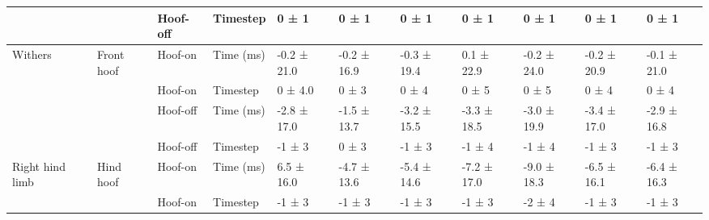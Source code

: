 \begin{sidewaystable}[!htbp]
{\begin{tabular}{p{3cm}p{2cm}p{2cm}p{2cm}p{1.5cm}p{1.5cm}p{1.5cm}p{1.5cm}p{1.5cm}p{1.5cm}p{1.5cm}}
                                  &                                                & Hoof-off                     & Timestep                      & 0 ± 1                           & 0 ± 1                           & 0 ± 1                           & 0 ± 1                           & 0 ± 1                            & 0 ± 1                           & 0 ± 1       \\
                                  \midrule
\multicolumn{1}{l}{Withers}          & \multicolumn{1}{l}{Front hoof}                    & Hoof-on                      & Time (ms)                     & -0.2 ± 21.0                     & -0.2 ± 16.9                     & -0.3 ± 19.4                     & 0.1 ± 22.9                      & -0.2 ± 24.0                      & -0.2 ± 20.9                     & -0.1 ± 21.0 \\
                                  &                                                & Hoof-on                      & Timestep                      & 0 ± 4.0                         & 0 ± 3                           & 0 ± 4                           & 0 ± 5                           & 0 ± 5                            & 0 ± 4                           & 0 ± 4       \\
                                  &                                                & Hoof-off                     & Time (ms)                     & -2.8 ± 17.0                     & -1.5 ± 13.7                     & -3.2 ± 15.5                     & -3.3 ± 18.5                     & -3.0 ± 19.9                      & -3.4 ± 17.0                     & -2.9 ± 16.8 \\
                                  &                                                & Hoof-off                     & Timestep                      & -1 ± 3                          & 0 ± 3                           & -1 ± 3                          & -1 ± 4                          & -1 ± 4                           & -1 ± 3                          & -1 ± 3      \\
                                  \midrule
\multicolumn{1}{l}{Right hind limb}  & \multicolumn{1}{l}{Hind hoof}                     & Hoof-on                      & Time (ms)                     & 6.5 ± 16.0                      & -4.7 ± 13.6                     & -5.4 ± 14.6                     & -7.2 ± 17.0                     & -9.0 ± 18.3                      & -6.5 ± 16.1                     & -6.4 ± 16.3 \\
                                  &                                                & \multicolumn{1}{l}{Hoof-on}  & \multicolumn{1}{l}{Timestep}  & \multicolumn{1}{l}{-1 ± 3}      & \multicolumn{1}{l}{-1 ± 3}      & \multicolumn{1}{l}{-1 ± 3}      & \multicolumn{1}{l}{-1 ± 3}      & \multicolumn{1}{l}{-2 ± 4}       & \multicolumn{1}{l}{-1 ± 3}      & -1 ± 3      \\

\end{tabular}}
\end{sidewaystable}

